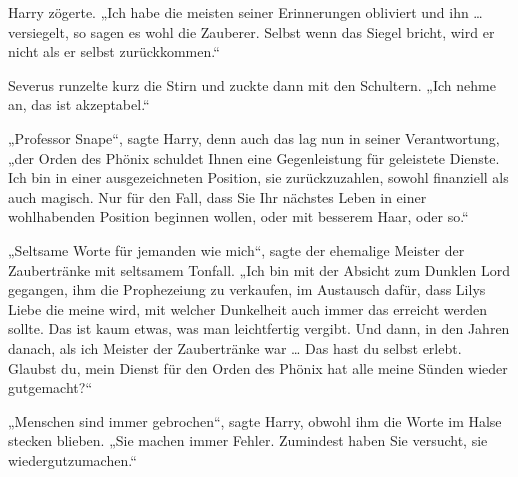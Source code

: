 Harry zögerte.
„Ich habe die meisten seiner Erinnerungen obliviert und ihn … versiegelt, so sagen es wohl die Zauberer. Selbst wenn das Siegel bricht, wird er nicht als er selbst zurückkommen.“

Severus runzelte kurz die Stirn und zuckte dann mit den Schultern.
„Ich nehme an, das ist akzeptabel.“

„Professor Snape“, sagte Harry, denn auch das lag nun in seiner Verantwortung, „der Orden des Phönix schuldet Ihnen eine Gegenleistung für geleistete Dienste. Ich bin in einer ausgezeichneten Position, sie zurückzuzahlen, sowohl finanziell als auch magisch. Nur für den Fall, dass Sie Ihr nächstes Leben in einer wohlhabenden Position beginnen wollen, oder mit besserem Haar, oder so.“

„Seltsame Worte für jemanden wie mich“, sagte der ehemalige Meister der Zaubertränke mit seltsamem Tonfall.
„Ich bin mit der Absicht zum Dunklen Lord gegangen, ihm die Prophezeiung zu verkaufen, im Austausch dafür, dass Lilys Liebe die meine wird, mit welcher Dunkelheit auch immer das erreicht werden sollte. Das ist kaum etwas, was man leichtfertig vergibt. Und dann, in den Jahren danach, als ich Meister der Zaubertränke war … Das hast du selbst erlebt. Glaubst du, mein Dienst für den Orden des Phönix hat alle meine Sünden wieder gutgemacht?“

„Menschen sind immer gebrochen“, sagte Harry, obwohl ihm die Worte im Halse stecken blieben.
„Sie machen immer Fehler. Zumindest haben Sie versucht, sie wiedergutzumachen.“

